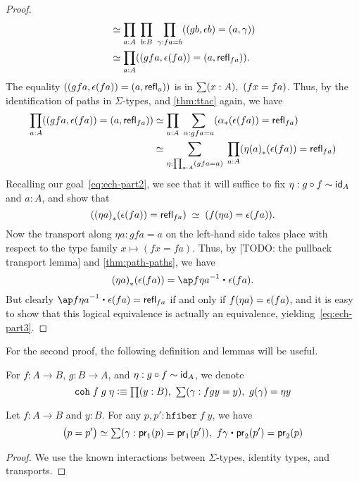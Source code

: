 \begin{proof}
\begin{align*}
    &\simeq \prod_{a:A} \;\prod_{b:B} \;\prod_{\gamma:fa=b} ((gb,\epsilon b)= (a,\gamma))\\
    &\simeq \prod_{a:A}  ((gfa,\epsilon (fa))= (a,\refl {fa})).
  \end{align*}
  The equality $((gfa,\epsilon (fa))= (a,\refl a))$ is in $\sm{x:A} (fx = fa)$.
  Thus, by the identification of paths in $\Sigma$-types, and \autoref{thm:ttac} again, we have
  \begin{align*}
    \prod_{a:A}  ((gfa,\epsilon (fa))= (a,\refl {fa}))
    &\simeq \prod_{a:A}\; \sum_{\alpha:gfa = a} (\trans{\alpha}{\epsilon(fa)} = \refl{fa})\\
    &\simeq \sum_{\eta:\prod_{a:A} (gfa = a)} \; \prod_{a:A} (\trans{\eta(a)}{\epsilon(fa)} = \refl{fa})
  \end{align*}
  Recalling our goal~\eqref{eq:ech-part2}, we see that it will suffice to fix ${\eta: g \circ f \htpy \idfunc[A]}$ and $a:A$, and show that
  \begin{equation}
    \label{eq:ech-part3}
    (\trans{(\eta a)}{\epsilon(fa)} = \refl{fa})
    \;\simeq\;
    (\map{f}{\eta a} = \epsilon(fa)).
  \end{equation}
  Now the transport along $\eta a : gfa = a$ on the left-hand side takes place with respect to the type family $x\mapsto (fx=fa)$.
  Thus, by [TODO: the pullback transport lemma] and \autoref{thm:path-paths}, we have
  \[\trans{(\eta a)}{\epsilon(fa)} = \opp{\ap f {\eta a}} \ct \epsilon(fa).\]
  But clearly $\opp{\ap f {\eta a}} \ct \epsilon(fa) = \refl{fa}$ if and only if $\map{f}{\eta a} = \epsilon(fa)$, and it is easy to show that this logical equivalence is actually an equivalence, yielding~\eqref{eq:ech-part3}.
\end{proof}

For the second proof, the following definition and lemmas will be useful.

\begin{defn}
For $f : A \to B$, $g : B \to A$, and $\eta : g \circ f \sim \idfunc[A]$, we denote
\[ \coh{f}{g}{\eta} \defeq \prd{y : B} \sm{\gamma : fgy = y} g(\gamma) = \eta y \]
\end{defn}

\begin{lem}\label{lem:hfib}
Let $f : A \to B$ and $y : B$. For any $p, p' : \mathtt{hfiber} \; f \;y$, we have
\[ \big(p = p'\big) \simeq \sm{\gamma : \proj{1}(p) = \proj{1}(p')} f\gamma \ct \proj{2}(p') = \proj{2}(p) \]
\end{lem}
\begin{proof}
We use the known interactions between $\Sigma$-types, identity types, and transports.
\end{proof}

